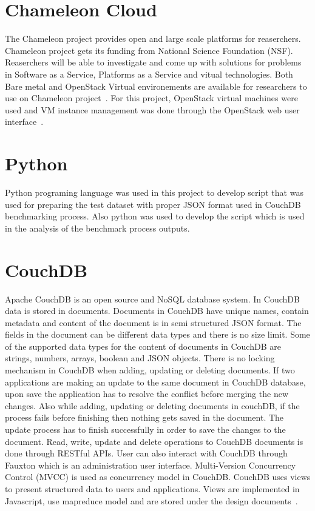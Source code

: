 \section{Chameleon Cloud}
The Chameleon project provides open and large scale platforms for
reaserchers. Chameleon project gets its funding from National Science
Foundation (NSF). Reaserchers will be able to investigate and come up
with solutions for problems in Software as a Service, Platforms as a
Service and vitual technologies. Both Bare metal and OpenStack Virtual
environements are available for researchers to use on Chameleon
project~\cite{www-Chameleon}. For this project, OpenStack virtual
machines were used and VM instance management was done through the
OpenStack web user interface~\cite{www-ChameleonDoc}. 

\section{Python}
Python programing language was used in this project to develop script
that was used for  preparing the test dataset with proper JSON format
used in CouchDB benchmarking process. Also python was used to develop
the script which is used in the analysis of the benchmark process outputs.

\section{CouchDB}
Apache CouchDB is an open source and NoSQL database system. In CouchDB
data is stored in documents. Documents in CouchDB have unique names, contain
metadata and content of the document is in semi structured JSON format. The fields in
the document can be different data types and there is no size
limit. Some of the supported data types for the content of documents
in CouchDB are strings, numbers, arrays, boolean and JSON
objects. There is no locking mechanism in CouchDB when adding,
updating or deleting documents. If two applications are making an
update to the same document in CouchDB database, upon save the
application has to resolve the conflict before merging the new
changes. Also while adding, updating or deleting documents in couchDB,
if the process fails before finishing then nothing gets saved in the
document. The update process has to finish successfully in order to
save the changes to the document. Read, write, update and delete
operations to CouchDB documents is done through RESTful
APIs. User can also interact with CouchDB through Fauxton which is
an administration user interface. Multi-Version Concurrency Control
(MVCC) is used as concurrency model in CouchDB. CouchDB uses views to
present structured data to users and applications. Views are
implemented in Javascript, use mapreduce model and are stored under
the design documents~\cite{www-Couchdb}. 

